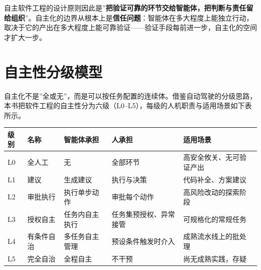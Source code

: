 \documentclass[
]{ctexbook}
\newcounter{none}
\begin{document}
自主软件工程的设计原则因此是''\textbf{把验证可靠的环节交给智能体，把判断与责任留给组织}''。自主化的边界从根本上是\textbf{信任问题}：智能体在多大程度上能独立行动，取决于它的产出在多大程度上能可靠验证------验证手段每前进一步，自主化的空间才扩大一步。

\section{自主性分级模型}\label{ux81eaux4e3bux6027ux5206ux7ea7ux6a21ux578b}

自主化不是''全或无''，而是可以按任务配置的连续体。借鉴自动驾驶的分级思路，本书把软件工程的自主性分为六级（L0--L5），每级的人机职责与适用场景如下表所示。

{\def\LTcaptype{none} %
\begin{longtable}[]{@{}
  >{\raggedright\arraybackslash}p{}
  >{\raggedright\arraybackslash}p{}
  >{\raggedright\arraybackslash}p{}
  >{\raggedright\arraybackslash}p{}
  >{\raggedright\arraybackslash}p{}@{}}
\toprule\noalign{}
\begin{minipage}[b]{\linewidth}\raggedright
级别
\end{minipage} & \begin{minipage}[b]{\linewidth}\raggedright
名称
\end{minipage} & \begin{minipage}[b]{\linewidth}\raggedright
智能体承担
\end{minipage} & \begin{minipage}[b]{\linewidth}\raggedright
人承担
\end{minipage} & \begin{minipage}[b]{\linewidth}\raggedright
适用场景
\end{minipage} \\
\midrule\noalign{}
\endhead
\bottomrule\noalign{}
\endlastfoot
L0 & 全人工 & 无 & 全部环节 & 高安全攸关、无可验证产出 \\
L1 & 建议 & 生成建议 & 执行与决策 & 代码补全、方案建议 \\
L2 & 审批执行 & 执行单步动作 & 审批每个动作 & 高风险改动的探索阶段 \\
L3 & 授权自主 & 任务内自主执行 & 任务集预授权、异常接管 &
可规格化的常规任务 \\
L4 & 有条件自治 & 多任务自主管理 & 预设条件触发时介入 &
成熟流水线上的批处理 \\
L5 & 完全自治 & 全程自主 & 不干预 & 尚无成熟实践，存疑 \\
\end{longtable}
}
\end{document}
